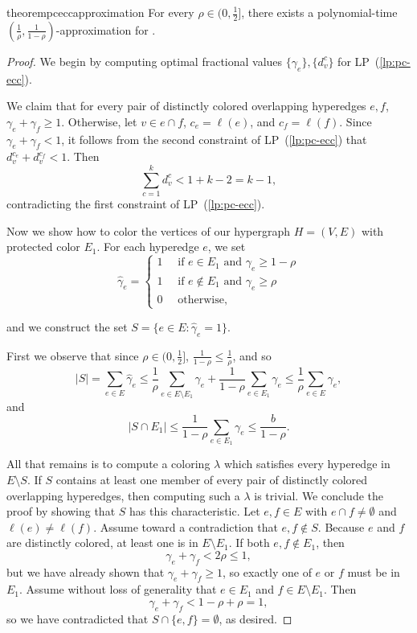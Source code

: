 \begin{restatable}{theorem}{pceccapproximation}\label{thm:pc-ECC-approximation}
    For every $\rho \in (0, \frac{1}{2}]$, there exists a polynomial-time $(\frac{1}{\rho}, \frac{1}{1 - \rho})$-approximation for \pcECC{}.
\end{restatable}
\begin{proof}
    We begin by computing optimal fractional values $\{\gamma_e\}, \{d_v^c\}$ for LP~(\ref{lp:pc-ecc}).

    We claim that for every pair of distinctly colored overlapping hyperedges $e, f$, $\gamma_e + \gamma_f \geq 1$.
    Otherwise, let $v \in e \cap f$, $c_e = \ell(e)$, and $c_f = \ell(f)$. Since $\gamma_e + \gamma_f < 1$,
    it follows from the second constraint of LP~(\ref{lp:pc-ecc}) that $d_v^{c_e} + d_v^{c_f} < 1$. Then
    \[
        \sum_{c = 1}^{k} d_v^c < 1 + k - 2 = k - 1,
    \]
    contradicting the first constraint of LP~(\ref{lp:pc-ecc}).

    Now we show how to color the vertices of our hypergraph $H = (V, E)$ with protected color $E_1$.
    For each hyperedge $e$, we set
    \[
        \hat{\gamma}_e = \begin{cases}
            1 \quad\text{ if } e \in E_1 \text{ and } \gamma_e \geq 1 - \rho \\
            1 \quad\text{ if } e \notin E_1 \text{ and } \gamma_e \geq \rho  \\
            0 \quad\text{ otherwise,}
        \end{cases}
    \]

    and we construct the set $S = \{e \in E \colon \hat{\gamma}_e = 1\}$.

    First we observe that since $\rho \in (0, \frac{1}{2}]$, $\frac{1}{1 - \rho} \leq \frac{1}{\rho}$, and so
    \[
        |S| = \sum_{e \in E} \hat{\gamma}_e \leq \frac{1}{\rho}\sum_{e \in E \setminus E_1} \gamma_e + \frac{1}{1 - \rho}\sum_{e \in E_1} \gamma_e \leq \frac{1}{\rho}\sum_{e \in E} \gamma_e,
    \]
    and
    \[
        |S \cap E_1| \leq \frac{1}{1 - \rho}\sum_{e \in E_1} \gamma_e \leq \frac{b}{1 - \rho}.
    \]

    All that remains is to compute a coloring $\lambda$ which satisfies every hyperedge in $E \setminus S$. If $S$ contains at least one member of every pair of distinctly colored overlapping hyperedges, then computing such a $\lambda$ is trivial.
    We conclude the proof by showing that $S$ has this characteristic.
    Let $e, f \in E$ with $e \cap f \neq \emptyset$ and $\ell(e) \neq \ell(f)$.
    Assume toward a contradiction that $e, f \notin S$.
    Because $e$ and $f$ are distinctly colored, at least one is in $E \setminus E_1$.
    If both $e, f \notin E_1$, then
    \[
        \gamma_e + \gamma_f < 2\rho \leq 1,
    \]
    but we have already shown that $\gamma_e + \gamma_f \geq 1$, so exactly one of $e$ or $f$ must be in $E_1$. Assume without loss of generality that $e \in E_1$ and $f \in E \setminus E_1$.
    Then
    \[
        \gamma_e + \gamma_f < 1 - \rho + \rho = 1,
    \]
    so we have contradicted that $S \cap \{e, f\} = \emptyset$, as desired.

\end{proof}

